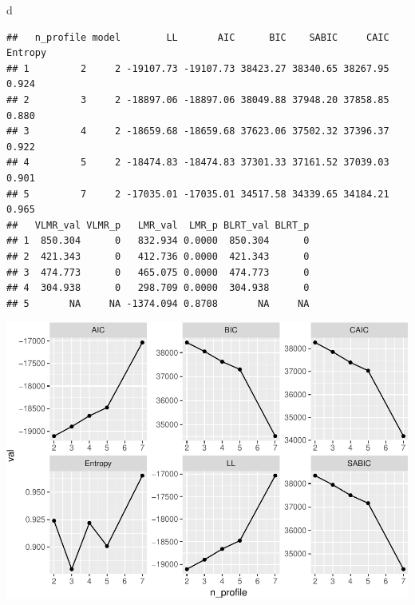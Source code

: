 \documentclass[]{msu-thesis}
\newenvironment{Shaded}{\begin{snugshade}}{\end{snugshade}}
\newcommand{\KeywordTok}[1]{\textcolor[rgb]{0.13,0.29,0.53}{\textbf{#1}}}
\newcommand{\DataTypeTok}[1]{\textcolor[rgb]{0.13,0.29,0.53}{#1}}
\newcommand{\StringTok}[1]{\textcolor[rgb]{0.31,0.60,0.02}{#1}}
\newcommand{\OperatorTok}[1]{\textcolor[rgb]{0.81,0.36,0.00}{\textbf{#1}}}
\newcommand{\NormalTok}[1]{#1}
\theoremstyle{definition}
\theoremstyle{definition}
\theoremstyle{definition}
\theoremstyle{remark}
\begin{document}
\begin{Shaded}
\begin{Highlighting}[]
\NormalTok{d}
\end{Highlighting}
\end{Shaded}

\begin{verbatim}
##   n_profile model        LL       AIC      BIC    SABIC     CAIC Entropy
## 1         2     2 -19107.73 -19107.73 38423.27 38340.65 38267.95   0.924
## 2         3     2 -18897.06 -18897.06 38049.88 37948.20 37858.85   0.880
## 3         4     2 -18659.68 -18659.68 37623.06 37502.32 37396.37   0.922
## 4         5     2 -18474.83 -18474.83 37301.33 37161.52 37039.03   0.901
## 5         7     2 -17035.01 -17035.01 34517.58 34339.65 34184.21   0.965
##   VLMR_val VLMR_p   LMR_val  LMR_p BLRT_val BLRT_p
## 1  850.304      0   832.934 0.0000  850.304      0
## 2  421.343      0   412.736 0.0000  421.343      0
## 3  474.773      0   465.075 0.0000  474.773      0
## 4  304.938      0   298.709 0.0000  304.938      0
## 5       NA     NA -1374.094 0.8708       NA     NA
\end{verbatim}

\begin{Shaded}
\end{Shaded}

\includegraphics{rosenberg-dissertation_files/figure-latex/compare-solutions-model2-1.pdf}
\end{document}
